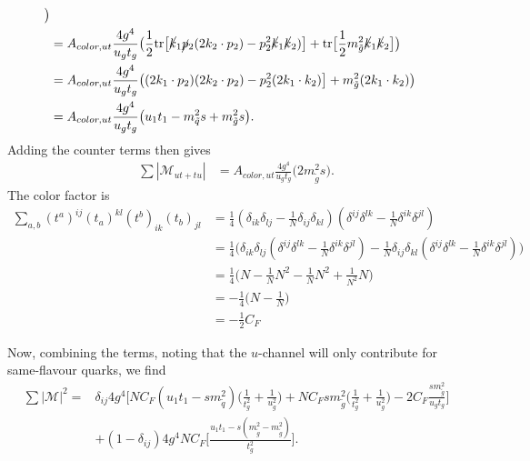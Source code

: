 \documentclass[11pt]{article}
\begin{document}
\begin{flushleft}
\begin{align*}
  \big)\\
&= A_{color, ut} \frac{4 g^4}{u_gt_g} \big(
 \frac{1}{2} \text{tr} \big[ \cancel{k}_1 \cancel{p}_2 (2 k_2 \cdot p_2)- p_2^2\cancel{k}_1 \cancel{k}_2)  \big] + \text{tr} \big[\frac{1}{2} m_{\tilde{g}}^2 \cancel{k}_1  \cancel{k}_2\big]
  \big)\\
  &=  A_{color, ut} \frac{4 g^4}{u_gt_g} \big(
(2k_1 \cdot p_2) (2 k_2 \cdot p_2)- p_2^2(2 k_1 \cdot k_2)  \big] + m_{\tilde{g}}^2(2 k_1 \cdot k_2)
  \big)\\
  &= A_{color, ut} \frac{4 g^4}{u_gt_g} \big(
u_1t_1- m_{\tilde{q}}^2s + m_{\tilde{g}}^2s
  \big).
\end{align*}
Adding the counter terms then gives 
\begin{align*}
\sum |\mathcal{M}_{ut+tu}| &= A_{color, ut} \frac{4 g^4}{u_gt_g} \big(2 m_{\tilde{g}}^2s   \big).
\end{align*}
The color factor is
\begin{align*}
\sum_{a,b}(t^a)^{ij}(t_a)^{kl}(t^b)_{ik}(t_b)_{jl} &= \frac{1}{4}(\delta_{ik}\delta_{lj}-\frac{1}{N}\delta_{ij}\delta_{kl})(\delta^{ij}\delta^{lk}-\frac{1}{N}\delta^{ik}\delta^{jl})\\
 &= \frac{1}{4} \big(\delta_{ik}\delta_{lj}(\delta^{ij}\delta^{lk}-\frac{1}{N}\delta^{ik}\delta^{jl}) -\frac{1}{N}\delta_{ij}\delta_{kl}(\delta^{ij}\delta^{lk}-\frac{1}{N}\delta^{ik}\delta^{jl})\big)\\
 &= \frac{1}{4} \big(N-\frac{1}{N}N^2 - \frac{1}{N}N^2 + \frac{1}{N^2} N \big)\\
 &= - \frac{1}{4}\big(N -\frac{1}{N} \big)\\
 &= - \frac{1}{2}C_F
\end{align*}
\end{flushleft}

\begin{flushleft}
Now, combining the terms, noting that the $u$-channel will only contribute for same-flavour quarks, we find
\begin{align*}
\sum |\mathcal{M}|^2 =& \delta_{ij}  4g^4\Big[NC_F(u_1t_1-sm_{\tilde{q}}^2) \big( \frac{1}{t_g^2} + \frac{1}{u_g^2} \big) + NC_Fsm_{\tilde{g}}^2\big(\frac{1}{t_g^2} + \frac{1}{u_g^2}\big) -2C_F\frac{sm_{\tilde{g}}^2}{u_gt_g} \Big]\\
&+ (1-\delta_{ij})4g^4NC_F \Big[\frac{u_1t_1-s(m_{\tilde{g}}^2-m_{\tilde{g}}^2)}{t_g^2} \Big].
\end{align*}
\end{flushleft}


\pagebreak
\end{document}
